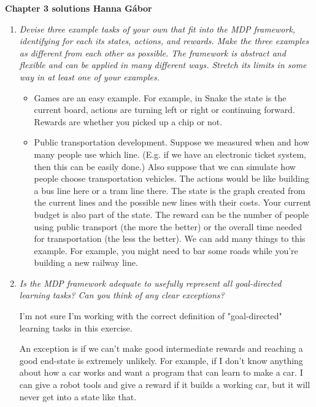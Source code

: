 \documentclass[12pt,a4paper]{article}
\begin{document}
\textbf{Chapter 3 solutions  \hfill Hanna Gábor}

\begin{enumerate}
  \item
    \textit{Devise three example tasks of your own that fit into the MDP framework,
    identifying for each its states, actions, and rewards. Make the three examples as different
    from each other as possible. The framework is abstract and flexible and can be applied in
    many different ways. Stretch its limits in some way in at least one of your examples.}
    \begin{itemize}
      \item Games are an easy example. For example, in Snake the state is the current board, actions are
      turning left or right or continuing forward. Rewards are whether you picked up
      a chip or not.
      \item Public transportation development. Suppose we measured when and how many people
      use which line. (E.g. if we have an electronic ticket system, then this can be easily done.)
      Also suppose that we can simulate how people choose transportation vehicles. The actions
      would be like building a bus line here or a tram line there. The state is the graph created from
      the current lines and the possible new lines with their costs. Your current budget is
      also part of the state.
      The reward can be the number of people using public transport (the more the better)
      or the overall time needed for transportation (the less the better).
      We can add many things to this example. For example, you might need to bar some
      roads while you're building a new railway line.
    \end{itemize}
  \item
    \textit{Is the MDP framework adequate to usefully represent all goal-directed
    learning tasks? Can you think of any clear exceptions?}

    I'm not sure I'm working with the correct definition of "goal-directed" learning tasks
    in this exercise.

    An exception is if we can't make good intermediate rewards and reaching a good end-state
    is extremely unlikely. For example, if I don't know anything about how a car works
    and want a program that can learn to make a car. I can give a robot tools and give a reward
    if it builds a working car, but it will never get into a state like that.


\end{enumerate}
\end{document}
